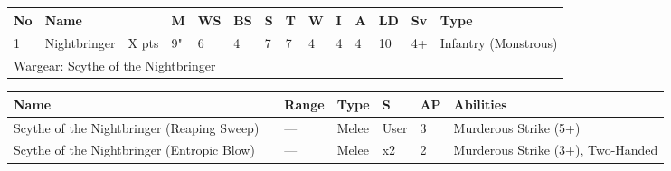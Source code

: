 \newpage
{}

\noindent
\begin{tabular}{||m{10pt} m{95pt} m{30pt} m{11pt} m{11pt} m{11pt} m{11pt} m{11pt} m{11pt} m{11pt} m{11pt} m{11pt} m{11pt} m{125pt}||}
	\hline
	No & Name & & M & WS & BS & S & T & W & I & A & LD & Sv & Type \\
	\hline
	1 & Nightbringer & X pts & 9" & 6 & 4 & 7 & 7 & 4 & 4 & 4 & 10 & 4+ & Infantry (Monstrous)\\
	\hline
	\hline
	\multicolumn{14}{||Z{532 pt}||}{Wargear: Scythe of the Nightbringer}\\
	\hline
\end{tabular}

\noindent
\begin{tabular}{||m{140pt} m{0pt} m{31pt} m{55pt} m{12pt} m{12pt} m{210pt}||}
	\hline
	Name & & Range & Type & S & AP & Abilities \\
	\hline
	Scythe of the Nightbringer (Reaping Sweep) &  & — & Melee & User & 3 & Murderous Strike (5+) \\
	Scythe of the Nightbringer (Entropic Blow) &  & — & Melee & x2 & 2 & Murderous Strike (3+), Two-Handed \\
	\hline
\end{tabular}

